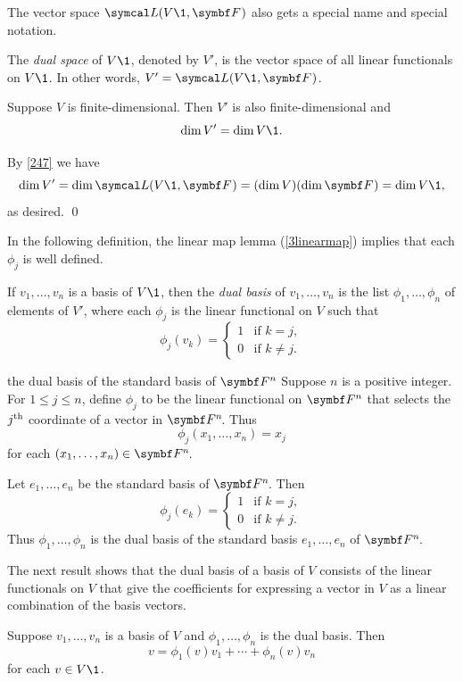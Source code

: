 The vector space $\L(V\1, \F{})$ also gets a special name and special notation.

{The \emph{dual space} of $V\1$, denoted by $V'\!$, is the vector space of all linear \mbox{functionals} on $V\1$. In other words, $V' = \L(V\1, \F{})$.}

{Suppose $V$ is finite-dimensional. Then $V'$ is also finite-dimensional and
\[
\dim V' = \dim V\1.
\]}

\proof
By \ref{247} we have
\[
\dim V' = \dim \L(V\1, \F{}) = (\dim V)(\dim \F{}) = \dim V\1,
\]
as desired.
\qed

In the following definition, the linear map lemma (\ref{3linearmap}) implies that each $\phi_j$ is well defined.

{If $v_1, \dots, v_n$ is a basis of $V\1$, then the \emph{dual basis} of $v_1, \dots, v_n$ is the list $\phi_1, \dots, \phi_n$ of elements of $V'\!$, where each $\phi_j$ is the linear functional on $V$ such that
\[
\phi_j(v_k) =
\begin{cases}
1 & \text{if } k = j,\\
0 & \text{if } k \ne j.
\end{cases}
\]
}

\begin{example}[dualstandard]{the dual basis of the standard basis of\/ $\F{n}$}
Suppose $n$ is a positive integer. For $1 \le j \le n$, define $\phi_j$ to be the linear functional on $\F{n}$ that selects the $j^{\text{{th}}}$ coordinate of a vector in $\FF{n}$. Thus
\[
\phi_j(x_1, \dots, x_n) = x_j
\]
for each $(x_1, \dots, x_n) \in \FF{n}$.

Let $e_1, \dots, e_n$ be the standard basis of $\FF{n}$. Then
\[
\phi_j(e_k) = \begin{cases}
1 & \text{if } k = j,\\
0 & \text{if } k \ne j.
\end{cases}
\]
Thus $\phi_1, \dots, \phi_n$ is the dual basis of the standard basis $e_1, \dots, e_n$ of $\FF{n}$.
\end{example}

The next result shows that the dual basis of a basis of $V$ consists of the linear functionals on $V$ that give the coefficients for expressing a vector in $V$ as a linear combination of the basis vectors.

{Suppose $v_1, \ldots, v_n$ is a basis of $V$ and $\phi_1, \ldots, \phi_n$ is the dual basis. Then
\[
v = \phi_1(v) v_1 + \cdots + \phi_n(v) v_n
\]
for each $v \in V\1$.}

